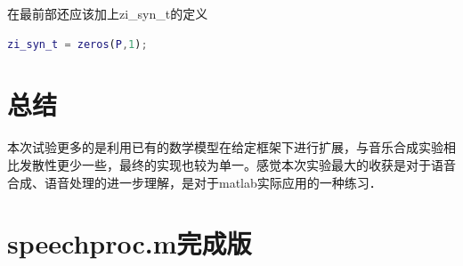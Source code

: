 \documentclass{ctexart}
\begin{document}
在最前部还应该加上zi\_syn\_t的定义
\begin{lstlisting}[language=matlab]
zi_syn_t = zeros(P,1);
\end{lstlisting}

\section{总结}
本次试验更多的是利用已有的数学模型在给定框架下进行扩展，与音乐合成实验相比发散性更少一些，最终的实现也较为单一。感觉本次实验最大的收获是对于语音合成、语音处理的进一步理解，是对于matlab实际应用的一种练习．

\section{speechproc.m完成版}

\end{document}
